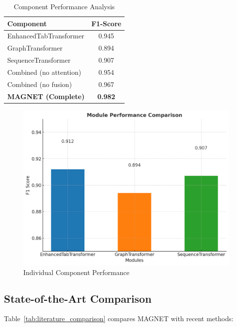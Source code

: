 \documentclass[a4paper,11pt]{article}
\begin{document}
\begin{table}[!htb]
  \centering
  \caption{Component Performance Analysis}
  \label{tab:component_analysis}
  \begin{tabular}{@{}lc@{}}
    \toprule
    \textbf{Component} & \textbf{F1-Score} \\
    \midrule
    EnhancedTabTransformer & 0.945 \\
    GraphTransformer & 0.894 \\
    SequenceTransformer & 0.907 \\
    \midrule
    Combined (no attention) & 0.954 \\
    Combined (no fusion) & 0.967 \\
    \textbf{MAGNET (Complete)} & \textbf{0.982} \\
    \bottomrule
  \end{tabular}
\end{table}

\begin{figure}[!htb]
  \centering
  \includegraphics[width=0.9\linewidth]{../images/fig_module_comparison_en.png}
  \caption{Individual Component Performance}
  \label{fig:module_comparison}
\end{figure}

\subsection{State-of-the-Art Comparison}
Table~\ref{tab:literature_comparison} compares MAGNET with recent methods:
\end{document}
